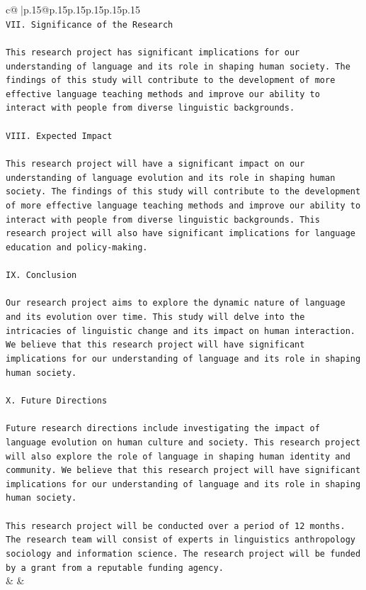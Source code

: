\documentclass{article}
\begin{document}
{\begin{supertabular}{c@{$\;$}|p{.15\linewidth}@{}p{.15\linewidth}p{.15\linewidth}p{.15\linewidth}p{.15\linewidth}p{.15\linewidth}}
{{{\\ 
\texttt{VII. Significance of the Research} \\
\\ 
\texttt{This research project has significant implications for our understanding of language and its role in shaping human society. The findings of this study will contribute to the development of more effective language teaching methods and improve our ability to interact with people from diverse linguistic backgrounds.} \\
\\ 
\texttt{VIII. Expected Impact} \\
\\ 
\texttt{This research project will have a significant impact on our understanding of language evolution and its role in shaping human society. The findings of this study will contribute to the development of more effective language teaching methods and improve our ability to interact with people from diverse linguistic backgrounds. This research project will also have significant implications for language education and policy{-}making.} \\
\\ 
\texttt{IX. Conclusion} \\
\\ 
\texttt{Our research project aims to explore the dynamic nature of language and its evolution over time. This study will delve into the intricacies of linguistic change and its impact on human interaction. We believe that this research project will have significant implications for our understanding of language and its role in shaping human society.} \\
\\ 
\texttt{X. Future Directions} \\
\\ 
\texttt{Future research directions include investigating the impact of language evolution on human culture and society. This research project will also explore the role of language in shaping human identity and community. We believe that this research project will have significant implications for our understanding of language and its role in shaping human society.} \\
\\ 
\texttt{This research project will be conducted over a period of 12 months. The research team will consist of experts in linguistics anthropology sociology and information science. The research project will be funded by a grant from a reputable funding agency.} \\
            }
        }
    }
    & & \\ \\


\end{supertabular}}
\end{document}
